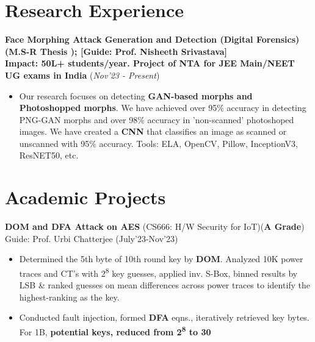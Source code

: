 \documentclass[10.8pt, a4paper]{extarticle}
\newcommand{\shorterSection}[1]{\vspace{-10pt}\section{#1}}
\begin{document}
\shorterSection{Research Experience}  
\textbf{Face Morphing Attack Generation and Detection (Digital Forensics) (M.S-R Thesis );  [Guide: Prof. Nisheeth Srivastava] } 
\vspace{2.8pt}
\\\textbf{Impact: 50L+ students/year. Project of NTA for JEE Main/NEET UG exams in India}
\hfill\hfill(\textit{Nov'23 - Present})

\begin{itemize}  

          \item Our research focuses on detecting \textbf{GAN-based morphs and Photoshopped morphs}. We have achieved over 95\% accuracy in detecting PNG-GAN morphs and over 98\% accuracy in 'non-scanned' photoshoped images. We have created a \textbf{CNN} that classifies an image as scanned or unscanned with 95\% accuracy. Tools: ELA, OpenCV, Pillow, InceptionV3, ResNET50, etc.\\[-0.6cm]
        
          
    \end{itemize}




\vspace{5pt}
\shorterSection{Academic Projects}
\vspace{2pt}

\textbf{DOM and DFA Attack on AES} (CS666: H/W Security for IoT)(\textbf{A Grade}) Guide: Prof. Urbi Chatterjee \href{https://github.com/souvikcseiitk/CS666-Hardware-Security-for-Internet-of-Things/tree/main/Assignment%203}{\faGithub{}}  \hfill(July'23-Nov'23)
	\\[-0.6cm]

 \begin{itemize}
\item  Determined the 5th byte of 10th round key by \textbf{DOM}. Analyzed 10K power traces and CT's with 2\textsuperscript{8} key guesses, applied inv. S-Box, binned results by LSB \& ranked guesses on mean differences across power traces to identify the highest-ranking as the key. \\[-0.6cm]
\item Conducted fault injection, formed \textbf{DFA} eqns., iteratively retrieved key bytes. For 1B, \textbf{potential keys, reduced from 2\textsuperscript{8} to 30} \\[-0.6cm]
\end{itemize}
\end{document}
